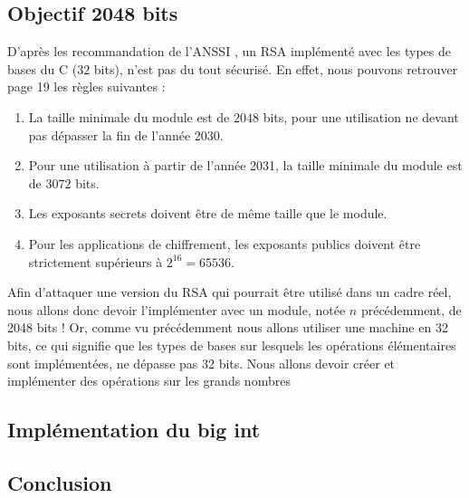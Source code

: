 \subsection{Objectif 2048 bits}
D'après les recommandation de l'ANSSI \cite{anssi:guide}, un RSA implémenté avec les types de bases du C ($32$ bits), n'est pas du tout sécurisé. En effet, nous pouvons retrouver page 19 les règles suivantes :
\begin{enumerate}
  \item La taille minimale du module est de $2048$ bits, pour une utilisation ne devant
pas dépasser la fin de l’année 2030.
  \item Pour une utilisation à partir de l’année 2031, la taille minimale du module
est de $3072$ bits.
  \item Les exposants secrets doivent être de même taille que le module.
  \item Pour les applications de chiffrement, les exposants publics doivent être strictement supérieurs à $2^{16} = 65536$.
\end{enumerate}
Afin d'attaquer une version du RSA qui pourrait être utilisé dans un cadre réel, nous allons donc devoir l'implémenter avec un module, notée $n$ précédemment, de 2048 bits ! Or, comme vu précédemment nous allons utiliser une machine en 32 bits, ce qui signifie que les types de bases sur lesquels les opérations élémentaires sont implémentées, ne dépasse pas 32 bits. Nous allons devoir créer et implémenter des opérations sur les grands nombres 
\subsection{Implémentation du big int}
\subsection{Conclusion}
